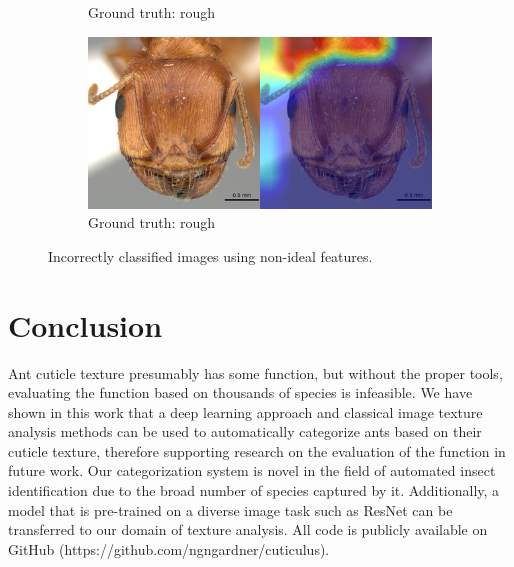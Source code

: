 \documentclass{aci}
\numberwithin{equation}{section}
\begin{document}
\begin{figure}
\begin{subfigure}{\subwidth}
        \caption{Ground truth: rough}
        \label{fig:incorrect_nonideal_61}
    \end{subfigure}
    \begin{subfigure}{\subwidth}
        \includegraphics[width=1\linewidth]{thesis_assets/gradcam/incorrect_nonideal/204.png}
        \caption{Ground truth: rough}
        \label{fig:incorrect_nonideal_204}
    \end{subfigure}
    \caption{Incorrectly classified images using non-ideal features.}
    \label{fig:incorrect_nonideal}
\end{figure}

\FloatBarrier
\section{Conclusion}
Ant cuticle texture presumably has some function, but without the proper tools,
evaluating the function based on thousands of species is infeasible. We have
shown in this work that a deep learning approach and classical image texture
analysis methods can be used to automatically categorize ants based on their
cuticle texture, therefore supporting research on the evaluation of the function
in future work. Our categorization system is novel in the field of automated
insect identification due to the broad number of species captured by it.
Additionally, a model that is pre-trained on a diverse image task such as ResNet
can be transferred to our domain of texture analysis. All code is publicly
available on GitHub (https://github.com/ngngardner/cuticulus).



\end{document}
